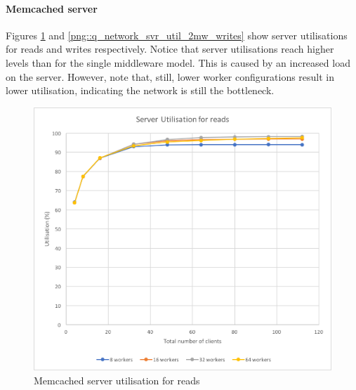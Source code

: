 \documentclass[11pt,a4paper]{article}
\begin{document}
\paragraph{Memcached server}
Figures \ref{png::q_network_svr_util_2mw_reads} and \ref{png::q_network_svr_util_2mw_writes} show server utilisations for reads and writes respectively. Notice that server utilisations reach higher levels than for the single middleware model. This is caused by an increased load on the server. However, note that, still, lower worker configurations result in lower utilisation, indicating the network is still the bottleneck.
\begin{figure}[!h]
    \centering
    \begin{minipage}[b]{.45\textwidth}
        \centering
        \includegraphics[width=\textwidth]{processing/graphics/q_network_svr_util_2mw_reads.png}
        \caption{Memcached server utilisation for reads}
        \label{png::q_network_svr_util_2mw_reads}
    \end{minipage}
    \qquad
    \begin{minipage}[b]{.45\textwidth}
        \centering

\end{minipage}
\end{figure}
\end{document}

